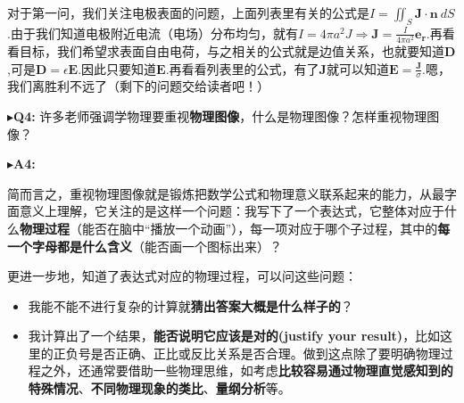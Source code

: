 \documentclass{ctexart}
\begin{document}
\begin{myexample}
\begin{enumerate}[leftmargin=*, labelsep=0.5em]
    对于第一问，我们关注电极表面的问题，上面列表里有关的公式是$I = \iint_{S}^{}{\mathbf{J} \cdot \mathbf{n}\ dS}$.由于我们知道电极附近电流（电场）分布均匀，就有$I = 4\pi a^{2}J \Longrightarrow \mathbf{J} = \frac{I}{4\pi a^{2}}\mathbf{e}_{\mathbf{r}}$.再看看目标，我们希望求表面自由电荷，与之相关的公式就是边值关系，也就要知道$\mathbf{D}$,可是$\mathbf{D} = \epsilon\mathbf{E}$.因此只要知道$\mathbf{E}$.再看看列表里的公式，有了$\mathbf{J}$就可以知道$\mathbf{E}\mathbf{=}\frac{\mathbf{J}}{\sigma}$.嗯，我们离胜利不远了（剩下的问题交给读者吧！）
  \end{enumerate}
\end{myexample}

\noindent$\blacktriangleright$\;\textbf{Q4:} 许多老师强调学物理要重视\textbf{物理图像}，什么是物理图像？怎样重视物理图像？

\noindent$\blacktriangleright$\;\textbf{A4:}

简而言之，重视物理图像就是锻炼把数学公式和物理意义联系起来的能力，从最字面意义上理解，它关注的是这样一个问题：我写下了一个表达式，它整体对应于什么\textbf{物理过程}（能否在脑中“播放一个动画”），每一项对应于哪个子过程，其中的\textbf{每一个字母都是什么含义}（能否画一个图标出来）？

更进一步地，知道了表达式对应的物理过程，可以问这些问题：

\begin{itemize}
\item 我能不能不进行复杂的计算就\textbf{猜出答案大概是什么样子的}？
\item 我计算出了一个结果，\textbf{能否说明它应该是对的(justify your result)}，比如这里的正负号是否正确、正比或反比关系是否合理。做到这点除了要明确物理过程之外，还通常要借助一些物理思维，如考虑\textbf{比较容易通过物理直觉感知到的特殊情况}、\textbf{不同物理现象的类比}、\textbf{量纲分析}等。
\end{itemize}
\end{document}
